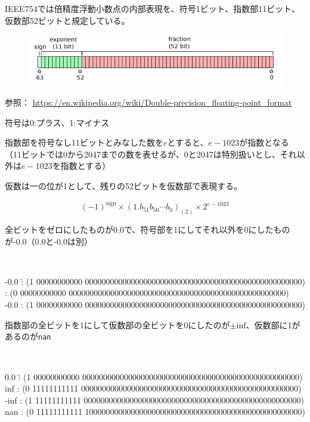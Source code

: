 \documentclass[unicode,lualatex,aspectratio=169]{beamer}
\begin{document}
\begin{frame}[fragile]
  IEEE754では倍精度浮動小数点の内部表現を、符号1ビット、指数部11ビット、仮数部52ビットと規定している。
\begin{figure}[!ht]
\includegraphics[scale=.1]{img/IEEE_754_Double_Floating_Point_Format.png}
\end{figure}

{\tiny 参照： \url{https://en.wikipedia.org/wiki/Double-precision\_floating-point\_format}}

符号は0:プラス、1:マイナス

指数部を符号なし11ビットとみなした数を$e$とすると、$e-1023$が指数となる（11ビットでは0から2047までの数を表せるが、0と2047は特別扱いとし、それ以外は$e-1023$を指数とする）

仮数は一の位が1として、残りの52ビットを仮数部で表現する。

\[ (-1)^\mathrm{sign} \times (1.b_{51} b_{50} \cdots b_{0})_{(2)} \times 2^{e-1023} \]
\end{frame}
\begin{frame}[fragile]
全ビットをゼロにしたものが0.0で、符号部を1にしてそれ以外を0にしたものが-0.0（0.0と-0.0は別）

{\tiny\tt
\begin{tabbing}
    -0.0 \=: (1 00000000000 0000000000000000000000000000000000000000000000000000) \>: (0 00000000000 0000000000000000000000000000000000000000000000000000)\\
    -0.0 \>: (1 00000000000 0000000000000000000000000000000000000000000000000000)
  \end{tabbing}
}
指数部の全ビットを1にして仮数部の全ビットを0にしたのが$\pm\text{inf}$、仮数部に1があるのが{\tt nan}
{\tiny\tt
\begin{tabbing}
    0.0 \=: (1 00000000000 0000000000000000000000000000000000000000000000000000)\kill
    inf \>: (0 11111111111 0000000000000000000000000000000000000000000000000000)\\
    -inf \>: (1 11111111111 0000000000000000000000000000000000000000000000000000)\\
    nan \>: (0 11111111111 1000000000000000000000000000000000000000000000000000)
  \end{tabbing}
}


\end{frame}
\end{document}
